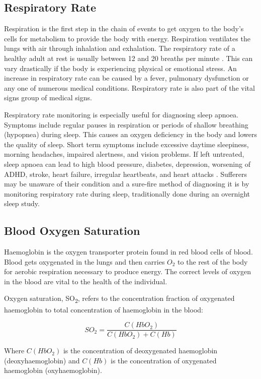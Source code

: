 \subsection{Respiratory Rate}
Respiration is the first step in the chain of events to get oxygen to the body's cells for metabolism to provide the body with energy. Respiration ventilates the lungs with air through inhalation and exhalation. The respiratory rate of a healthy adult at rest is usually between 12 and 20 breaths per minute \citep{medscapeBreathingRate}. This can vary drastically if the body is experiencing physical or emotional stress. An increase in respiratory rate can be caused by a fever, pulmonary dysfunction or any one of numerous medical conditions. Respiratory rate is also part of the vital signs group of medical signs.

\medskip
Respiratory rate monitoring is especially useful for diagnosing sleep apnoea. Symptoms include regular pauses in respiration or periods of shallow breathing (hypopnea) during sleep. This causes an oxygen deficiency in the body and lowers the quality of sleep. Short term symptoms include excessive daytime sleepiness, morning headaches, impaired alertness, and vision problems. If left untreated, sleep apnoea can lead to high blood pressure, diabetes, depression, worsening of ADHD, stroke, heart failure, irregular heartbeats, and heart attacks \citep{webMDSleepApnoea}. Sufferers may be unaware of their condition and a sure-fire method of diagnosing it is by monitoring respiratory rate during sleep, traditionally done during an overnight sleep study.

\subsection{Blood Oxygen Saturation}

Haemoglobin is the oxygen transporter protein found in red blood cells of blood. Blood gets oxygenated in the lungs and then carries $O_2$ to the rest of the body for aerobic respiration necessary to produce energy. The correct levels of oxygen in the blood are vital to the health of the individual.

\medskip
Oxygen saturation, SO\textsubscript{2}, refers to the concentration fraction of oxygenated haemoglobin to total concentration of haemoglobin in the blood:

$$SO_2  =  \frac{C(HbO_2)}{C(HbO_2)+C(Hb)}$$

Where $C(HbO_2)$ is the concentration of deoxygenated haemoglobin (deoxyhaemoglobin) and $C(Hb)$ is the concentration of oxygenated haemoglobin (oxyhaemoglobin).

